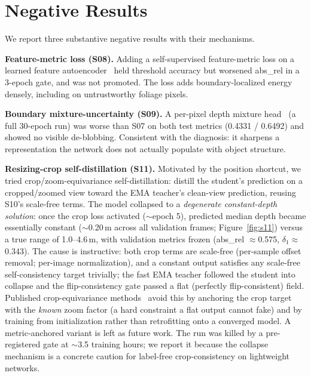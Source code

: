 \documentclass[conference]{IEEEtran}
\begin{document}
\section{Negative Results}
\label{sec:negatives}
We report three substantive negative results with their mechanisms.

\textbf{Feature-metric loss (S08).} Adding a self-supervised feature-metric loss
on a learned feature autoencoder~\cite{shu2020featdepth} held threshold accuracy
but worsened abs\_rel in a 3-epoch gate, and was not promoted. The loss adds
boundary-localized energy densely, including on untrustworthy foliage pixels.

\textbf{Boundary mixture-uncertainty (S09).} A per-pixel depth mixture
head~\cite{tsob2025} (a full 30-epoch run) was worse than S07 on both test
metrics (0.4331 / 0.6492) and showed no visible de-blobbing. Consistent with the
diagnosis: it sharpens a representation the network does not actually populate
with object structure.

\textbf{Resizing-crop self-distillation (S11).} Motivated by the position
shortcut, we tried crop/zoom-equivariance self-distillation: distill the
student's prediction on a cropped/zoomed view toward the EMA teacher's clean-view
prediction, reusing S10's scale-free terms. The model collapsed to a
\emph{degenerate constant-depth solution}: once the crop loss activated
($\sim$epoch 5), predicted median depth became essentially constant
($\sim$0.20\,m across all validation frames; Figure~\ref{fig:s11}) versus a true
range of 1.0--4.6\,m, with validation metrics frozen (abs\_rel $\approx$0.575,
$\delta_1\approx$0.343). The cause is instructive: both crop terms are scale-free
(per-sample offset removal; per-image normalization), and a constant output
satisfies any scale-free self-consistency target trivially; the fast EMA teacher
followed the student into collapse and the flip-consistency gate passed a flat
(perfectly flip-consistent) field. Published crop-equivariance
methods~\cite{bdedepth2023,he2022radepth} avoid this by anchoring the crop target
with the \emph{known} zoom factor (a hard constraint a flat output cannot fake)
and by training from initialization rather than retrofitting onto a converged
model. A metric-anchored variant is left as future work. The run was killed by a
pre-registered gate at $\sim$3.5 training hours; we report it because the collapse
mechanism is a concrete caution for label-free crop-consistency on lightweight
networks.
\end{document}
